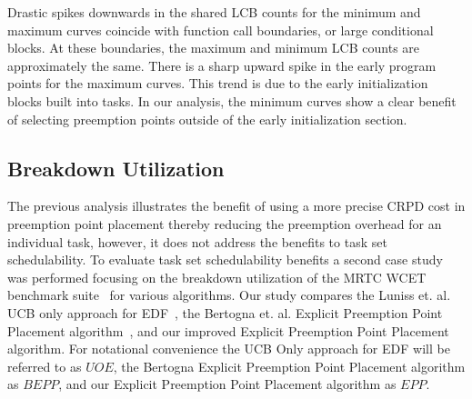 Drastic spikes downwards in the shared LCB counts for the minimum and maximum curves coincide with function call boundaries, or large conditional blocks. At these boundaries, the maximum and minimum LCB counts are approximately the same. There is a sharp upward spike in the early program points for the maximum curves. This trend is due to the early initialization blocks built into tasks. In our analysis, the minimum curves show a clear benefit of selecting preemption points outside of the early initialization section.
\vspace{-10pt}
\subsection{Breakdown Utilization}
The previous analysis illustrates the benefit of using a more precise CRPD cost in preemption point placement thereby reducing the preemption overhead
for an individual task, however, it does not address the benefits to task set schedulability. To evaluate task set schedulability benefits a second case study was performed focusing on the breakdown utilization of the MRTC WCET benchmark suite~\cite{mrtc:01} for various algorithms.  Our study compares the Luniss et. al. UCB only approach for EDF~\cite{lunniss:13}, the Bertogna et. al. Explicit Preemption Point Placement algorithm~\cite{bertogna:11}, and our improved Explicit Preemption Point Placement algorithm. For notational convenience the UCB Only approach for EDF will be referred to as ${UOE}$, the Bertogna Explicit Preemption Point Placement algorithm as ${BEPP}$, and our Explicit Preemption Point Placement algorithm as ${EPP}$.

